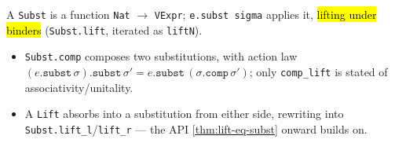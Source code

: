\begin{definition}
\label{def:subst}
\leanok
{}

 A \texttt{Subst} is a function \texttt{Nat} $\to$ \texttt{VExpr};
\texttt{e.subst sigma} applies it, \hl{lifting under binders} (\texttt{Subst.lift},
iterated as \texttt{liftN}).
\begin{itemize}
\item \texttt{Subst.comp} composes two substitutions, with action law
$(e.\texttt{subst}\,\sigma).\texttt{subst}\,\sigma' = e.\texttt{subst}\,(\sigma.\texttt{comp}\,\sigma')$;
only \texttt{comp\_lift} is stated of associativity/unitality.
\item A \texttt{Lift} absorbs into a substitution from either side, rewriting into
\texttt{Subst.lift\_l}/\texttt{lift\_r} --- the API \ref{thm:lift-eq-subst} onward builds
on.
\end{itemize}
\end{definition}

